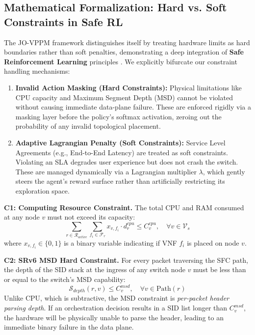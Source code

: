 \documentclass[12pt, a4paper, reqno, oneside]{book}
\begin{document}
\subsection{Mathematical Formalization: Hard vs. Soft Constraints in Safe RL}
The JO-VPPM framework distinguishes itself by treating hardware limits as hard boundaries rather than soft penalties, demonstrating a deep integration of \textbf{Safe Reinforcement Learning} principles \cite{ray2019benchmarking, ma2022conservative}. We explicitly bifurcate our constraint handling mechanisms:
\begin{enumerate}
    \item \textbf{Invalid Action Masking (Hard Constraints):} Physical limitations like CPU capacity and Maximum Segment Depth (MSD) cannot be violated without causing immediate data-plane failure. These are enforced rigidly via a masking layer before the policy's softmax activation, zeroing out the probability of any invalid topological placement.
    \item \textbf{Adaptive Lagrangian Penalty (Soft Constraints):} Service Level Agreements (e.g., End-to-End Latency) are treated as soft constraints. Violating an SLA degrades user experience but does not crash the switch. These are managed dynamically via a Lagrangian multiplier $\lambda$, which gently steers the agent's reward surface rather than artificially restricting its exploration space.
\end{enumerate} 

\textbf{C1: Computing Resource Constraint.} The total CPU and RAM consumed at any node $v$ must not exceed its capacity:
\begin{equation}
\sum_{r \in \mathcal{R}_{active}} \sum_{f_i \in \mathcal{F}_r} x_{v, f_i} \cdot d_r^{cpu} \le C_v^{cpu}, \quad \forall v \in \mathcal{V}_s
\end{equation}
where $x_{v, f_i} \in \{0,1\}$ is a binary variable indicating if VNF $f_i$ is placed on node $v$.

\textbf{C2: SRv6 MSD Hard Constraint.} For every packet traversing the SFC path, the depth of the SID stack at the ingress of any switch node $v$ must be less than or equal to the switch's MSD capability:
\begin{equation}
\mathcal{S}_{depth}(r, v) \le C_v^{msd}, \quad \forall v \in \text{Path}(r)
\end{equation}
Unlike CPU, which is subtractive, the MSD constraint is \textit{per-packet header parsing depth}. If an orchestration decision results in a SID list longer than $C_v^{msd}$, the hardware will be physically unable to parse the header, leading to an immediate binary failure in the data plane.
\end{document}

